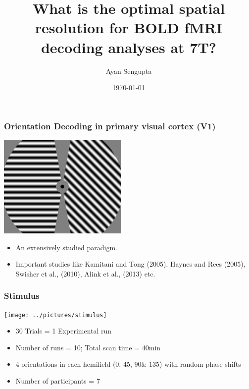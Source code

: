 \documentclass{beamer}
\title{What is the optimal spatial resolution for BOLD fMRI decoding analyses at 7T?}
\author{Ayan Sengupta\inst{1}}
\institute[Affiliations] %
{
  \inst{1}%
  Institute of Experimental Psychology\\
  Otto-von-Guericke University\\
  Magdeburg
}
\date{\today}
\begin{document}
\frame{\titlepage}
  \begin{frame}
    \frametitle{Orientation Decoding in primary visual cortex (V1)}
    \begin{center}
        \includegraphics[height=5cm]{../pictures/exp_frame}
    \end{center}
    \begin{itemize}
        \item An extensively studied paradigm.
        \item Important studies like Kamitani and Tong (2005), Haynes and Rees (2005),
        Swisher et al., (2010), Alink et al., (2013) etc.
    \end{itemize}
  \end{frame}
    \begin{frame}
        \frametitle{Stimulus}
            \begin{center}
                \texttt{[image: ../pictures/stimulus]}
            \end{center}
            \begin{itemize}
                \item 30 Trials = 1 Experimental run
                \item Number of runs = 10; Total scan time = 40min
                \item 4 orientations in each hemifield (0\textdegree, 45\textdegree, 90\textdegree \& 135\textdegree) with random phase shifts
                \item Number of participants = 7
            \end{itemize}

    \end{frame}
 
\end{document}
